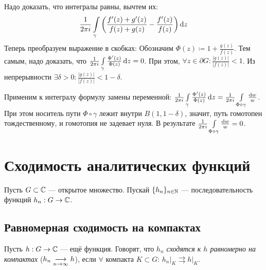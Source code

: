 \documentclass[a4paper]{report}
\begin{document}
{{    Надо доказать, что интегралы равны, вычтем их:
    \[\frac{1}{2\pi i}\int\limits_{\gamma}\left(\frac{f'(z) + g'(z)}{f(z) + g(z)} - \frac{f'(z)}{f(z)}\right)\operatorname{d}\! z\]
    Теперь преобразуем выражение в скобках:
    Обозначим $\Phi(z) \coloneqq 1 + \frac{g(z)}{f(z)}$.
    Тем самым, надо доказать, что $\frac{1}{2\pi i}\int\limits_{\gamma}\frac{\Phi'(z)}{\Phi(z)}\operatorname{d}\! z = 0$.
    При этом, $\forall z \in \partial G: \frac{|g(z)|}{|f(z)|} < 1$.
        Из непрерывности $\exists \delta > 0: \frac{|g(z)|}{|f(z)|} < 1 - \delta$.

    Применим к интегралу формулу замены переменной: $\frac{1}{2\pi i}\int\limits_{\gamma}\frac{\Phi'(z)}{\Phi(z)}\operatorname{d}\! z = \frac{1}{2\pi i}\int\limits_{\Phi \circ \gamma} \frac{\operatorname{d}\! w}{w}$.
    При этом носитель пути $\Phi \circ \gamma$ лежит внутри $B(1, 1 - \delta)$, значит, путь гомотопен тождественному, и гомотопия не задевает нуля.
    В результате $\frac{1}{2\pi i}\int\limits_{\Phi \circ \gamma} \frac{\operatorname{d}\! w}{w} = 0$.
    }
    }
    \section{Сходимость аналитических функций}
    Пусть $G \subset \mathbb{C}$ --- открытое множество.
    Пускай $\{h_n\}_{n \in \mathbb{N}}$ --- последовательность функций $h_n: G \rightarrow \mathbb{C}$.

    \subsection{Равномерная сходимость на компактах}
    Пусть $h: G \rightarrow \mathbb{C}$ --- ещё функция.
    Говорят, что \emph{$h_n$ сходятся к $h$ равномерно на компактах} ($h_n \underset{n \to \infty}{\longrightarrow} h$), если $\forall$ компакта $K \subset G$: $h_n\big|_K \rightrightarrows h\big|_K$.
\end{document}
